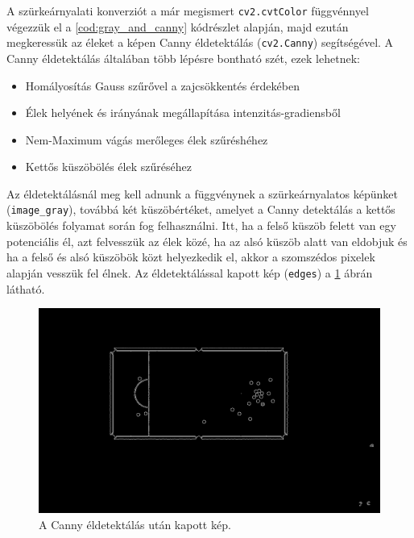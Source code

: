 \par A szürkeárnyalati konverziót a már megismert \lstinline{cv2.cvtColor} függvénnyel \cite{opencv_docs} végezzük el a \ref{cod:gray_and_canny} kódrészlet alapján, majd ezután megkeressük az éleket a képen Canny éldetektálás \cite{opencv_docs, canny_edge_detection} (\lstinline{cv2.Canny}) segítségével.
\newline A Canny éldetektálás általában több lépésre bontható szét, ezek lehetnek:

\begin{itemize}
    \setlength\itemsep{-2pt}
    \item Homályosítás Gauss szűrővel \cite{shapiro2001} a zajcsökkentés érdekében
    \item Élek helyének és irányának megállapítása intenzitás-gradiensből
    \item Nem-Maximum vágás merőleges élek szűréshéhez
    \item Kettős küszöbölés élek szűréséhez
\end{itemize}

\par Az éldetektálásnál meg kell adnunk a függvénynek a szürkeárnyalatos képünket (\lstinline{image_gray}), továbbá két küszöbértéket, amelyet a Canny detektálás a kettős küszöbölés folyamat során fog felhasználni. Itt, ha a felső küszöb felett van egy potenciális él, azt felvesszük az élek közé, ha az alsó küszöb alatt van eldobjuk és ha a felső és alsó küszöbök közt helyezkedik el, akkor a szomszédos pixelek alapján vesszük fel élnek. Az éldetektálással kapott kép (\lstinline{edges}) a \ref{fig:bemeneti_kep_edge} ábrán látható.

\begin{figure}[!ht]
    \centering
    \includegraphics[width=150mm, keepaspectratio]{figures/input_screen_edge.png}
    \caption{A Canny éldetektálás után kapott kép.}
    \label{fig:bemeneti_kep_edge}
\end{figure}

